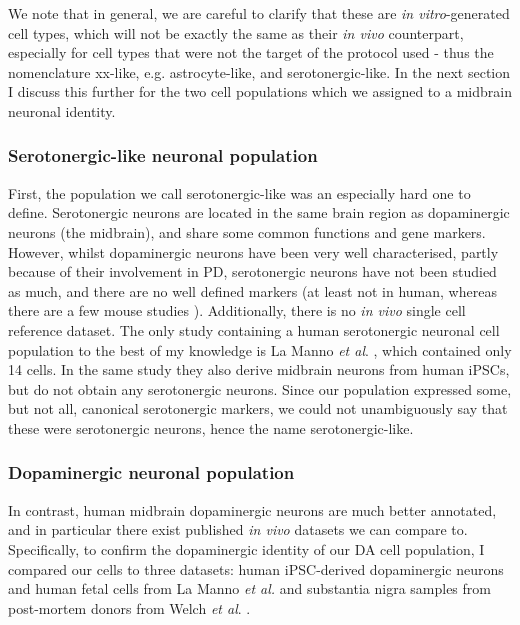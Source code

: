 We note that in general, we are careful to clarify that these are \textit{in vitro}-generated cell types, which will not be exactly the same as their \textit{in vivo} counterpart, especially for cell types that were not the target of the protocol used - thus the nomenclature xx-like, e.g. astrocyte-like, and serotonergic-like.
In the next section I discuss this further for the two cell populations which we assigned to a midbrain neuronal identity.

\subsubsection{Serotonergic-like neuronal population}

First, the population we call serotonergic-like was an especially hard one to define.
Serotonergic neurons are located in the same brain region as dopaminergic neurons 
(the midbrain),
and share some common functions and gene markers.
However, whilst dopaminergic neurons have been very well characterised, partly because of their involvement in PD, serotonergic neurons have not been studied as much, and there are no well defined markers (at least not in human, whereas there are a few mouse studies \cite{cummings2019serotonergic}).
Additionally, there is no \textit{in vivo} single cell reference dataset.
The only study containing a human serotonergic neuronal cell population to the best of my knowledge is La Manno \textit{et al}. \cite{la2016molecular}, which contained only 14 cells.
In the same study they also derive midbrain neurons from human iPSCs, but do not obtain any serotonergic neurons.
Since our population expressed some, but not all, canonical serotonergic markers, 
we could not unambiguously say that these were serotonergic neurons, hence the name serotonergic-like.

\subsubsection{Dopaminergic neuronal population}

In contrast, human midbrain dopaminergic neurons are much better annotated, and in particular there exist published \textit{in vivo} datasets we can compare to.
Specifically, to confirm the dopaminergic identity of our DA cell population, I compared our cells to three datasets: human iPSC-derived dopaminergic neurons and human fetal cells from La Manno \textit{et al.} \cite{la2016molecular} and substantia nigra samples from post-mortem donors from Welch \textit{et al}. \cite{welch2019single}. 
\\

